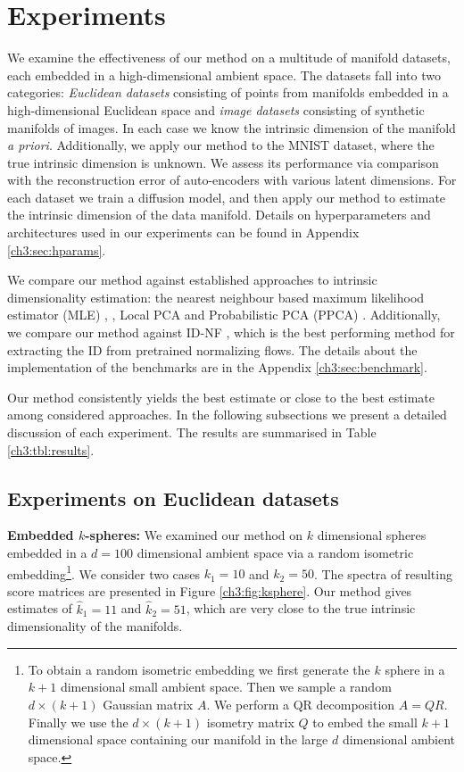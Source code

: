 \section{Experiments}
\label{ch3:sec:experiments}


We examine the effectiveness of our method on a multitude of manifold datasets, each embedded in a high-dimensional ambient space. The datasets fall into two categories: \textit{Euclidean datasets} consisting of points from manifolds embedded  in a high-dimensional Euclidean space and \textit{image datasets} consisting of synthetic manifolds of images.
In each case we know the intrinsic dimension of the manifold \textit{a priori}. Additionally, we apply our method to the MNIST dataset, where the true intrinsic dimension is unknown. We assess its performance via comparison with the reconstruction error of auto-encoders with various latent dimensions.  For each dataset we train a diffusion model, and then apply our method to estimate the intrinsic dimension of the data manifold. Details on hyperparameters and architectures used in our experiments can be found in Appendix \ref{ch3:sec:hparams}. 

We compare our method against established approaches to intrinsic dimensionality estimation: the nearest neighbour based maximum likelihood estimator (MLE) \cite{dim_MLE}, \cite{haro_mle}, Local PCA \cite{fan_local_pca} and Probabilistic PCA (PPCA) \cite{auto_ppca} \cite{ppca}. Additionally, we compare our method against ID-NF \cite{horvat2022nfid}, which is the best performing method for extracting the ID from pretrained normalizing flows. The details about the implementation of the benchmarks are in the Appendix \ref{ch3:sec:benchmark}.

Our method consistently yields the best estimate or close to the best estimate among considered approaches. In the following subsections we present a detailed discussion of each experiment. The results are summarised in Table \ref{ch3:tbl:results}.

\subsection{Experiments on Euclidean datasets}
\textbf{Embedded $k$-spheres:} We examined our method on $k$ dimensional spheres embedded in a $d=100$ dimensional ambient space via a random isometric embedding\footnote{To obtain a random isometric embedding we first generate the $k$ sphere in a $k+1$ dimensional small ambient space. Then we sample a random $d\times (k+1)$ Gaussian matrix $A$. We perform a QR decomposition $A = QR$. Finally we use the $d\times (k+1)$ isometry matrix $Q$ to embed the small $k+1$ dimensional space containing our manifold in the large $d$ dimensional ambient space.}. We consider two cases $k_1=10$ and $k_2=50$. The spectra of resulting score matrices are presented in Figure \ref{ch3:fig:ksphere}. Our method gives estimates of $\hat{k}_1 = 11$ and $\hat{k}_2 = 51$, which are very close to the true intrinsic dimensionality of the manifolds.

